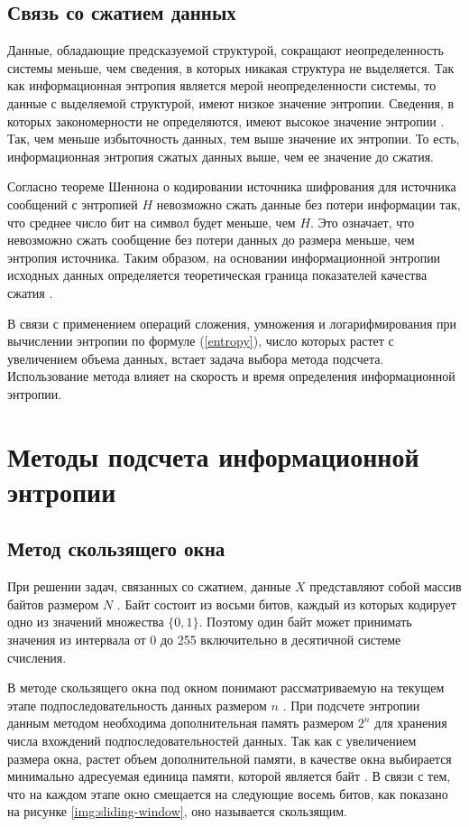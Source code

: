 \subsection{Связь со сжатием данных}\label{relation}

Данные, обладающие предсказуемой структурой, сокращают неопределенность системы меньше, чем сведения, в которых никакая структура не выделяется. Так как информационная энтропия является мерой неопределенности системы, то данные с выделяемой структурой, имеют низкое значение энтропии. Сведения, в которых закономерности не определяются, имеют высокое значение энтропии \cite{relation}. Так, чем меньше избыточность данных, тем выше значение их энтропии. То есть, информационная энтропия сжатых данных выше, чем ее значение до сжатия.

Согласно теореме Шеннона о кодировании источника шифрования для источника сообщений с энтропией $H$ невозможно сжать данные без потери информации так, что среднее число бит на символ будет меньше, чем $H$. Это означает, что невозможно сжать сообщение без потери данных до размера меньше, чем энтропия источника. Таким образом, на основании информационной энтропии исходных данных определяется теоретическая граница показателей качества сжатия \cite{theorem}.

В связи с применением операций сложения, умножения и логарифмирования при вычислении энтропии по формуле (\ref{entropy}), число которых растет с увеличением объема данных, встает задача выбора метода подсчета. Использование метода влияет на скорость и время определения информационной энтропии.

\section{Методы подсчета информационной энтропии}

\subsection{Метод скользящего окна}\label{sliding-window}

При решении задач, связанных со сжатием, данные $X$ представляют собой массив байтов размером $N$ \cite{bytes}. Байт состоит из восьми битов, каждый из которых кодирует одно из значений множества $\{0, 1\}$. Поэтому один байт может принимать значения из интервала от 0 до 255 включительно в десятичной системе счисления. 

В методе скользящего окна под окном понимают рассматриваемую на текущем этапе подпоследовательность данных размером $n$ \cite{sliding-window-method}. При подсчете энтропии данным методом необходима дополнительная память размером $2^n$ для хранения числа вхождений подпоследовательностей данных. Так как с увеличением размера окна, растет объем дополнительной памяти, в качестве окна выбирается минимально адресуемая единица памяти, которой является байт \cite{memory-unit}. В связи с тем, что на каждом этапе окно смещается на следующие восемь битов, как показано на рисунке \ref{img:sliding-window}, оно называется скользящим.

